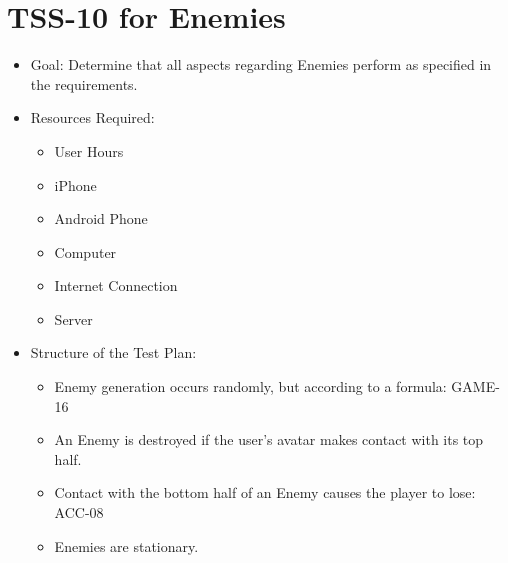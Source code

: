 \section{TSS-10 for Enemies}
\begin{itemize}
\item Goal: Determine that all aspects regarding Enemies perform as specified in the requirements.
\item Resources Required: 

\begin{itemize}
\item User Hours 
\item iPhone 
\item Android Phone 
\item Computer 
\item Internet Connection 
\item Server
\end{itemize}
\item Structure of the Test Plan: 

\begin{itemize}

\item Enemy generation occurs randomly, but according to a formula: GAME-16
\item An Enemy is destroyed if the user's avatar makes contact with its top half.
\item Contact with the bottom half of an Enemy causes the player to lose: ACC-08
\item Enemies are stationary.

\end{itemize}
\end{itemize}

